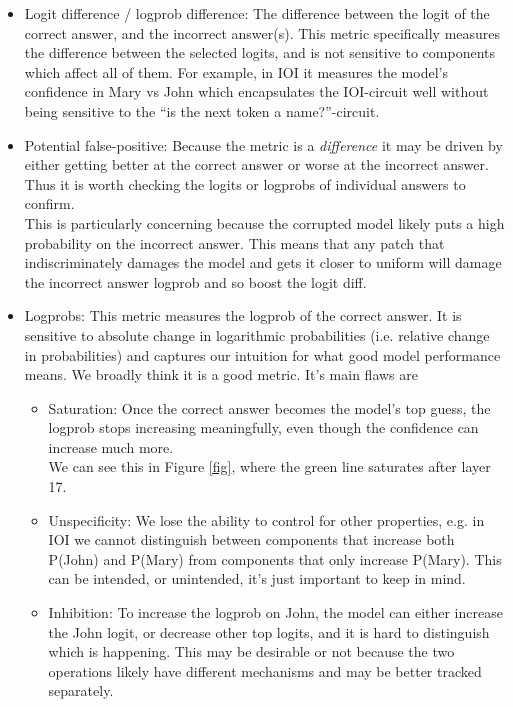 \documentclass[nonatbib]{article}
\begin{document}
\begin{itemize}
    \item Logit difference / logprob difference: The difference between the logit of the correct answer, and the incorrect answer(s). This metric specifically measures the difference between the selected logits, and is not sensitive to components which affect all of them. For example, in IOI it measures the model’s confidence in Mary vs John which encapsulates the IOI-circuit well without being sensitive to the “is the next token a name?”-circuit.
    \item Potential false-positive: Because the metric is a \textit{difference} it may be driven by either getting better at the correct answer or worse at the incorrect answer. Thus it is worth checking the logits or logprobs of individual answers to confirm.
    \\
    This is particularly concerning because the corrupted model likely puts a high probability on the incorrect answer. This means that any patch that indiscriminately damages the model and gets it closer to uniform will damage the incorrect answer logprob and so boost the logit diff.
    \item Logprobs: This metric measures the logprob of the correct answer. It is sensitive to absolute change in logarithmic probabilities (i.e. relative change in probabilities) and captures our intuition for what good model performance means. We broadly think it is a good metric. It’s main flaws are
    \begin{itemize}
        \item Saturation: Once the correct answer becomes the model's top guess, the logprob stops increasing meaningfully, even though the confidence can increase much more.
        \\
        We can see this in Figure \ref{fig}, where the green line saturates after layer 17.
        \item Unspecificity: We lose the ability to control for other properties, e.g. in IOI we cannot distinguish between components that increase both P(John) and P(Mary) from components that only increase P(Mary). This can be intended, or unintended, it’s just important to keep in mind.
        \item Inhibition: To increase the logprob on John, the model can either increase the John logit, or decrease other top logits, and it is hard to distinguish which is happening. This may be desirable or not because the two operations likely have different mechanisms and may be better tracked separately.

\end{itemize}
\end{itemize}
\end{document}
